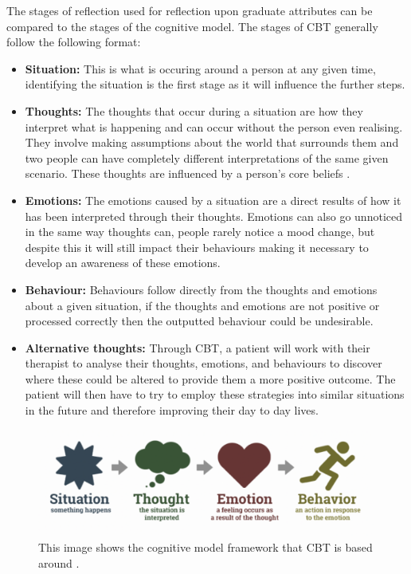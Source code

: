 \documentclass{l4proj}
\begin{document}
The stages of reflection used for reflection upon graduate attributes can be compared to the stages of the cognitive model. The stages of CBT generally follow the following format:

\begin{itemize}
    \item \textbf{Situation:} This is what is occuring around a person at any given time, identifying the situation is the first stage as it will influence the further steps.
    \item \textbf{Thoughts:} The thoughts that occur during a situation are how they interpret what is happening and can occur without the person even realising. They involve making assumptions about the world that surrounds them and two people can have completely different interpretations of the same given scenario. These thoughts are influenced by a person's core beliefs \citep{therapist_aid_psychoeducation}. 
    \item \textbf{Emotions:} The emotions caused by a situation are a direct results of how it has been interpreted through their thoughts. Emotions can also go unnoticed in the same way thoughts can, people rarely notice a mood change, but despite this it will still impact their behaviours making it necessary to develop an awareness of these emotions.
    \item \textbf{Behaviour:} Behaviours follow directly from the thoughts and emotions about a given situation, if the thoughts and emotions are not positive or processed correctly then the outputted behaviour could be undesirable.
    \item \textbf{Alternative thoughts:} Through CBT, a patient will work with their therapist to analyse their thoughts, emotions, and behaviours to discover where these could be altered to provide them a more positive outcome. The patient will then have to try to employ these strategies into similar situations in the future and therefore improving their day to day lives.
\end{itemize}

\begin{figure}[h!]
    \begin{centering}
    \includegraphics[scale=0.5]{images/cognitive-model.png}
    \caption{This image shows the cognitive model framework that CBT is based around \citep{therapist_aid_psychoeducation}.}
    \label{fig: CognitiveModel}
    \end{centering}
\end{figure}
\end{document}
